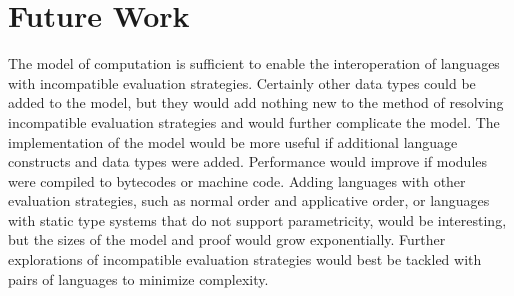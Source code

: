 \chapter{Future Work}

The model of computation is sufficient to enable the interoperation of languages with incompatible evaluation strategies.  Certainly other data types could be added to the model, but they would add nothing new to the method of resolving incompatible evaluation strategies and would further complicate the model.  The implementation of the model would be more useful if additional language constructs and data types were added.  Performance would improve if modules were compiled to bytecodes or machine code.  Adding languages with other evaluation strategies, such as normal order and applicative order, or languages with static type systems that do not support parametricity, would be interesting, but the sizes of the model and proof would grow exponentially.  Further explorations of incompatible evaluation strategies would best be tackled with pairs of languages to minimize complexity.